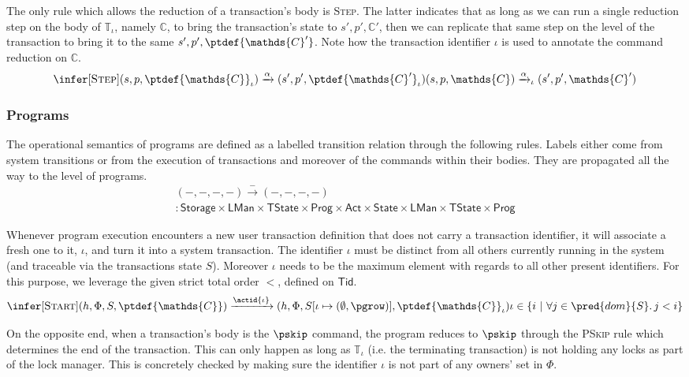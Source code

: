 The only rule which allows the reduction of a transaction's body is \textsc{Step}. The latter indicates that as long as we can run a single reduction step on the body of $\mathds{T}_\iota$, namely $\mathds{C}$, to bring the transaction's state to $s', p', \mathds{C}'$, then we can replicate that same step on the level of the transaction to bring it to the same $s', p', \ptdef{\mathds{C}'}$. Note how the transaction identifier $\iota$ is used to annotate the command reduction on $\mathds{C}$.
\[
\infer[\textsc{Step}]
{
	(s, p, \ptdef{\mathds{C}}_\iota)
	\xrightarrow{\alpha}
	(s', p', \ptdef{\mathds{C}'}_\iota)
}
{
	(s, p, \mathds{C})
	\xrightarrow{\alpha}_\iota
	(s', p', \mathds{C}')
}
\]

\subsubsection{Programs}

The operational semantics of programs are defined as a labelled transition relation through the following rules. Labels either come from system transitions or from the execution of transactions and moreover of the commands within their bodies. They are propagated all the way to the level of programs.
\begin{gather*}
(-, -, -, -) \xrightarrow{-} (-, -, -, -) \\
: \mathsf{Storage} \times \mathsf{LMan} \times \mathsf{TState} \times \mathsf{Prog} \times \mathsf{Act} \times \mathsf{State} \times \mathsf{LMan} \times \mathsf{TState} \times \mathsf{Prog}
\end{gather*}

Whenever program execution encounters a new user transaction definition that does not carry a transaction identifier, it will associate a fresh one to it, $\iota$, and turn it into a system transaction. The identifier $\iota$ must be distinct from all others currently running in the system (and traceable via the transactions state $S$). Moreover $\iota$ needs to be the maximum element with regards to all other present identifiers. For this purpose, we leverage the given strict total order $<$, defined on $\mathsf{Tid}$.
\[
	\infer[\textsc{Start}]
	{
		(h, \Phi, S, \ptdef{\mathds{C}})
		\xrightarrow{\actid{\iota}}
		(h, \Phi, S[\iota \mapsto (\emptyset, \pgrow)], \ptdef{\mathds{C}}_\iota)
	}
	{
		\iota \in \{ i\ |\ \forall j \in \pred{dom}{S} \ldotp j < i \}
	}
\]

On the opposite end, when a transaction's body is the $\pskip$ command, the program reduces to $\pskip$ through the \textsc{PSkip} rule which determines the end of the transaction. This can only happen as long as $\mathds{T}_\iota$ (i.e. the terminating transaction) is not holding any locks as part of the lock manager. This is concretely checked by making sure the identifier $\iota$ is not part of any owners' set in $\Phi$.

